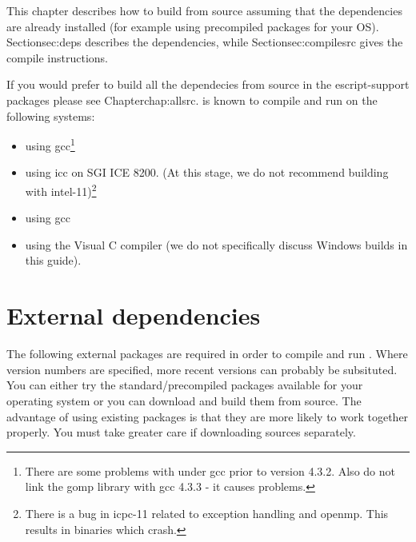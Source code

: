 %
%
%



This chapter describes how to build \esfinley from source assuming that the dependencies are already installed (for example using precompiled packages for your OS).
Section{sec:deps} describes the dependencies, while Section{sec:compilesrc} gives the compile instructions.

If you would prefer to build all the dependecies from source in the escript-support packages please see Chapter{chap:allsrc}.
\esfinley is known to compile and run on the following systems:
\begin{itemize}
 \item \linux using gcc\footnote{There are some problems with \openmp under gcc prior to version 4.3.2. Also do not link the gomp library with gcc 4.3.3 - it causes problems.}
\item \linux using icc on SGI ICE 8200. (At this stage, we do not recommend building with intel-11)\footnote{There is a bug in icpc-11 related to exception handling and openmp. This results in binaries which crash.}
\item \macosx using gcc
\item \winxp using the Visual C compiler (we do not specifically discuss Windows builds in this guide).
\end{itemize}

\section{External dependencies}
\label{sec:deps}
The following external packages are required in order to compile and run \esfinley.
Where version numbers are specified, more recent versions can probably be subsituted.
You can either try the standard/precompiled packages available for your operating system or you can download and build them from source.
The advantage of using existing packages is that they are more likely to work together properly.
You must take greater care if downloading sources separately.

